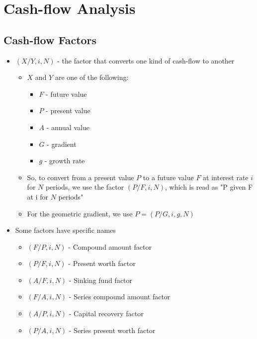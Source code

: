 \chapter{Cash-flow Analysis}


\section{Cash-flow Factors}

\begin{theorem}
    \begin{itemize}
        \item $(X/Y, i, N)$ - the factor that converts one kind of cash-flow to another
              \begin{itemize}
                  \item $X$ and $Y$ are one of the following:
                        \begin{itemize}
                            \item $F$ - future value
                            \item $P$ - present value
                            \item $A$ - annual value
                            \item $G$ - gradient
                            \item $g$ - growth rate
                        \end{itemize}
                  \item So, to convert from a present value $P$ to a future value $F$ at interest rate $i$ for $N$ periods, we use the factor $(P/F, i, N)$, which is read as "P given F at i for $N$ periods"
                  \item For the geometric gradient, we use $P = (P/G, i, g, N)$
              \end{itemize}
        \item Some factors have specific names
              \begin{itemize}
                  \item $(F/P, i, N)$ - Compound amount factor
                  \item $(P/F, i, N)$ - Present worth factor
                  \item $(A/F, i, N)$ - Sinking fund factor
                  \item $(F/A, i, N)$ - Series compound amount factor
                  \item $(A/P, i, N)$ - Capital recovery factor
                  \item $(P/A, i, N)$ - Series present worth factor
              \end{itemize}
    \end{itemize}
\end{theorem}

